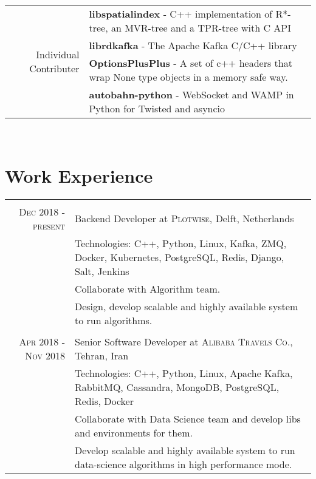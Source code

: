 \documentclass[a4paper,11pt]{article}
\begin{document}
\begin{tabular}{r|p{11cm}}

    \multirow{4}{*}{Individual Contributer}
    & \textbf{libspatialindex} - C++ implementation of R*-tree, an MVR-tree and a TPR-tree with C API\\
    & \textbf{librdkafka} - The Apache Kafka C/C++ library\\
    & \textbf{OptionsPlusPlus} - A set of c++ headers that wrap None type objects in a memory safe way.\\
    & \textbf{autobahn-python} - WebSocket and WAMP in Python for Twisted and asyncio\\

\end{tabular}\\

\section{Work Experience}
\begin{tabular}{r|p{11cm}}

    \multicolumn{2}{c}{}\\
    \textsc{Dec 2018 - present}
    & Backend Developer at \textsc{Plotwise},
    Delft, Netherlands\\
    &\footnotesize{Technologies: C++, Python, Linux, Kafka, ZMQ, Docker, Kubernetes, PostgreSQL, Redis, Django, Salt, Jenkins}\\
    &\footnotesize{Collaborate with Algorithm team.}\\
    &\footnotesize{Design, develop scalable and highly available system to run algorithms.}\\

    \multicolumn{2}{c}{}\\
    \textsc{Apr 2018 - Nov 2018}
    & Senior Software Developer at \textsc{Alibaba Travels Co.},
    Tehran, Iran\\
    &\footnotesize{Technologies: C++, Python, Linux, Apache Kafka, RabbitMQ, Cassandra, MongoDB, PostgreSQL, Redis, Docker}\\
    &\footnotesize{Collaborate with Data Science team and develop libs and environments for them.}\\
    &\footnotesize{Develop scalable and highly available system to run data-science algorithms in high performance mode.}\\

\end{tabular}
\end{document}
